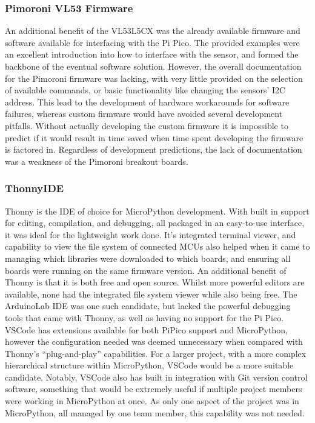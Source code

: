 \documentclass [12pt]{article}
\begin{document}
\subsubsection{Pimoroni VL53 Firmware}
An additional benefit of the VL53L5CX was the already available firmware and software available for interfacing with the Pi Pico. The provided examples were an excellent introduction into how to interface with the sensor, and formed the backbone of the eventual software solution. However, the overall documentation for the Pimoroni firmware was lacking, with very little provided on the selection of available commands, or basic functionality like changing the sensors’ I2C address. This lead to the development of hardware workarounds for software failures, whereas custom firmware would have avoided several development pitfalls. Without actually developing the custom firmware it is impossible to predict if it would result in time saved when time spent developing the firmware is factored in. Regardless of development predictions, the lack of documentation was a weakness of the Pimoroni breakout boards.

\subsubsection{ThonnyIDE}
Thonny is the IDE of choice for MicroPython development. With built in support for editing, compilation, and debugging, all packaged in an easy-to-use interface, it was ideal for the lightweight work done. It’s integrated terminal viewer, and capability to view the file system of connected MCUs also helped when it came to managing which libraries were downloaded to which boards, and ensuring all boards were running on the same firmware version.
An additional benefit of Thonny is that it is both free and open source. Whilst more powerful editors are available, none had the integrated file system viewer while also being free. The ArduinoLab IDE was one such candidate, but lacked the powerful debugging tools that came with Thonny, as well as having no support for the Pi Pico.
VSCode has extensions available for both PiPico support and MicroPython, however the configuration needed was deemed unnecessary when compared with Thonny’s “plug-and-play” capabilities. For a larger project, with a more complex hierarchical structure within MicroPython, VSCode would be a more suitable candidate. Notably, VSCode also has built in integration with Git version control software, something that would be extremely useful if multiple project members were working in MicroPython at once. As only one aspect of the project was in MicroPython, all managed by one team member, this capability was not needed.
\end{document}
